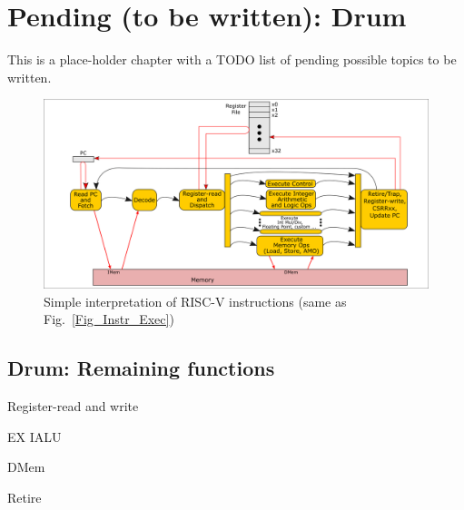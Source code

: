 

\chapter{Pending (to be written): Drum}


\setcounter{page}{1}
\renewcommand{\thepage}{\arabic{chapter}-\arabic{page}}

\label{ch_Drum_Pending}


This is a place-holder chapter with a TODO list of pending possible
topics to be written.

\begin{figure}[htbp]
  \centerline{\includegraphics[width=6in,angle=0]{ch030_RISCV_Design_Space/Figures/Fig_Instr_Exec}}
  \caption{\label{Fig_Pending_Simple_Instr_Exec}Simple interpretation of RISC-V instructions (same as Fig.~\ref{Fig_Instr_Exec})}
\end{figure}

\hdivider


\section{Drum: Remaining functions}

Register-read and write

EX IALU

DMem

Retire

